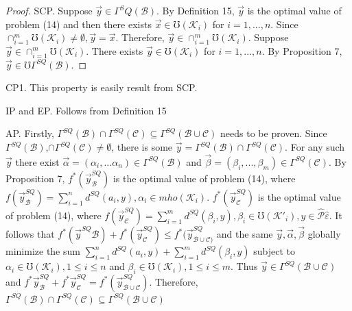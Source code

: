 \documentclass[]{iosart2c}
\begin{document}
  \begin{proof}
    SCP. Suppose $\vec{y} \in \Gamma^SQ(\mathcal{B})$. By Definition 15, $\vec{y}$ is the optimal value of problem (14) and then there exists $\vec{x} \in \mho(\mathcal{K}_i)$ for $i = 1, ... , n$. Since $\cap^m_{i=1}\mho(\mathcal{K}_i) \neq \emptyset, \vec{y} = \vec{x}$. Therefore, $\vec{y} \in \cap^m_{i=1}\mho(\mathcal{K}_i)$. Suppose $\vec{y} \in \cap^m_{i=1}\mho(\mathcal{K}_i)$. There exists $\vec{y} \in \mho(\mathcal{K}_i)$ for $i = 1, ... , n$. By Proposition 7, $\vec{y} \in \mho\Gamma^{SQ}(\mathcal{B})$.
  \end{proof}


  CP1. This property is easily result from SCP.

  IP and EP. Follows from Definition 15

  AP. Firstly, $\Gamma^{SQ}(\mathcal{B}) \cap \Gamma^{SQ}(\mathcal{C}) \subseteq \Gamma^{SQ}(\mathcal{B} \cup \mathcal{C})$ needs to be proven. Since $\Gamma^{SQ}(\mathcal{B})$,$\cap\Gamma^{SQ}(\mathcal{C}) \neq \emptyset$, there is some $\vec{y} = \Gamma^{SQ}(\mathcal{B}) \cap \Gamma^{SQ}(\mathcal{C})$. For any such $\vec{y}$ there exist $\vec{\alpha} = (\alpha_i, ... \alpha_n) \in \Gamma^{SQ}(\mathcal{B})$ and $\vec{\beta}= (\beta_i, ... , \beta_m) \in \Gamma^{SQ}(\mathcal{C})$. By Proposition 7, $f^*(\vec{y}^{SQ}_\mathcal{B})$ is the optimal value of problem (14), where $f(\vec{y}^{SQ}_\mathcal{B} ) = \sum^n_{i=1} d^{SQ}(a_i, y), \alpha_i \in mho(\mathcal{K}_i)$. $f^*(\vec{y}^{SQ}_\mathcal{C} )$ is the optimal value of problem (14), where $f (\vec{y}^{SQ}_\mathcal{C} ) = \sum^m_{i=1} d^{SQ}(\beta_i, y), \beta_i \in \mho(\mathcal{K}'_i), y \in \hat{\mathcal{P}} {\hat{\varepsilon}}$. It follows that $f^*(\vec{y}^{SQ} \mathcal{B} ) + f^*(\vec{y}^{SQ}_\mathcal{C} ) \le f^*(\vec{y}^{SQ}_{\mathcal{B}\cup\mathcal{C})}$ and the same $\vec{y}, \vec{\alpha}, \vec{\beta}$ globally minimize the sum $\sum^n_{i=1} d^{SQ}(a_i, y) +\sum^m_{i=1} d^{SQ}(\beta_i, y)$ subject to $\alpha_i \in \mho(\mathcal{K}_i), 1 \le i \le n$ and $\beta_i \in \mho(\mathcal{K}_i), 1 \le i \le m$. Thus $\vec{y} \in \Gamma^{SQ}(\mathcal{B} \cup \mathcal{C})$ and $f^*\vec{y}^{SQ}_\mathcal{B} + f^*\vec{y}^{SQ}_\mathcal{C} = f^*(\vec{y}^{SQ}_{\mathcal{B}\cup\mathcal{C}})$. Therefore, $\Gamma^{SQ}(\mathcal{B}) \cap \Gamma^{SQ}(\mathcal{C}) \subseteq \Gamma^{SQ}(\mathcal{B} \cup \mathcal{C})$
\end{document}
